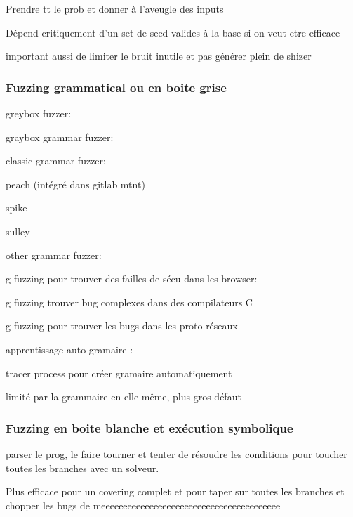 \documentclass[a4paper]{report}
\begin{document}
Prendre tt le prob et donner à l'aveugle des inputs \cite{Forrester2000}

Dépend critiquement d'un set de seed valides à la base si on veut etre efficace

important aussi de limiter le bruit inutile et pas générer plein de shizer


\subsubsection{Fuzzing grammatical ou en boite grise}

greybox fuzzer: \cite{fuzzingbook2022:GreyboxFuzzer}

graybox grammar fuzzer: \cite{fuzzingbook2022:GreyboxGrammarFuzzer}

classic grammar fuzzer:

peach (intégré dans gitlab mtnt) \cite{peach}

spike \cite{spike}

sulley \cite{sulley}

other grammar fuzzer: \cite{sutton2007fuzzing}

g fuzzing pour trouver des failles de sécu dans les browser:  \cite{holler2012fuzzing}

g fuzzing trouver bug complexes dans des compilateurs C  \cite{yang2011finding}

g fuzzing pour trouver les bugs dans les proto réseaux \cite{aflnet}

apprentissage auto gramaire : \cite{bastani2017synthesizing}

tracer process pour créer gramaire automatiquement \cite{hoschele2017mining}


limité par la grammaire en elle même, plus gros défaut


\subsubsection{Fuzzing en boite blanche et exécution symbolique}

parser le prog, le faire tourner et tenter de résoudre les conditions pour toucher toutes les branches avec un solveur.

Plus efficace pour un covering complet et pour taper sur toutes les branches et chopper les bugs de meeeeeeeeeeeeeeeeeeeeeeeeeeeeeeeeeeeeeeeee
\end{document}
